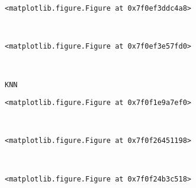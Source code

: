 \documentclass[11pt]{article}
\begin{document}
    
    \begin{verbatim}
<matplotlib.figure.Figure at 0x7f0ef3ddc4a8>
    \end{verbatim}

    
    \begin{center}
    \end{center}
    { \hspace*{\fill} \\}
    
    
    \begin{verbatim}
<matplotlib.figure.Figure at 0x7f0ef3e57fd0>
    \end{verbatim}

    
    \begin{center}
    \end{center}
    { \hspace*{\fill} \\}
    
    \begin{Verbatim}[commandchars=\\\{\}]
KNN

    \end{Verbatim}

    
    \begin{verbatim}
<matplotlib.figure.Figure at 0x7f0f1e9a7ef0>
    \end{verbatim}

    
    \begin{center}
    \end{center}
    { \hspace*{\fill} \\}
    
    
    \begin{verbatim}
<matplotlib.figure.Figure at 0x7f0f26451198>
    \end{verbatim}

    
    \begin{center}
    \end{center}
    { \hspace*{\fill} \\}
    
    
    \begin{verbatim}
<matplotlib.figure.Figure at 0x7f0f24b3c518>
    \end{verbatim}
\end{document}
